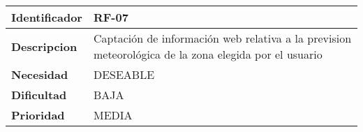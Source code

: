 \begin{center}
    \begin{tabular}{|p{2.6cm}|p{12cm}|}
    \hline
    \textbf{Identificador} & RF-07\\
    \hline
    \textbf{Descripcion} & Captación de información web relativa a la prevision meteorológica de la zona elegida por el usuario\\
    \hline
    \textbf{Necesidad} & DESEABLE\\
    \hline
    \textbf{Dificultad} & BAJA\\
    \hline
    \textbf{Prioridad} & MEDIA\\
    \hline
    \end{tabular}
\end{center}
